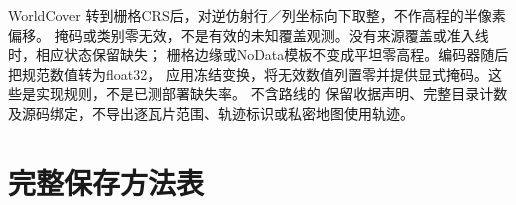 WorldCover 转到栅格CRS后，对逆仿射行／列坐标向下取整，不作高程的半像素偏移。
掩码或类别零无效，不是有效的未知覆盖观测。没有来源覆盖或准入线时，相应状态保留缺失；
栅格边缘或NoData模板不变成平坦零高程。编码器随后把规范数值转为float32，
应用冻结变换，将无效数值列置零并提供显式掩码。这些是实现规则，不是已测部署缺失率。
不含路线的  保留收据声明、完整目录计数
及源码绑定，不导出逐瓦片范围、轨迹标识或私密地图使用轨迹。


\section{完整保存方法表}



